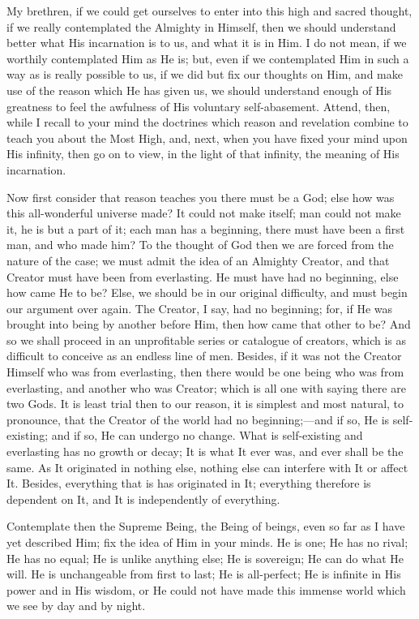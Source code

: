 My brethren, if we could get ourselves to enter into this high and
sacred thought, if we really contemplated the Almighty in Himself,
then we should understand better what His incarnation is to us, and
what it is in Him. I do not mean, if we worthily contemplated Him as
He is; but, even if we contemplated Him in such a way as is really
possible to us, if we did but fix our thoughts on Him, and make use of
the reason which He has given us, we should understand enough of His
greatness to feel the awfulness of His voluntary self-abasement.
Attend, then, while I recall to your mind the doctrines which reason
and revelation combine to teach you about the Most High, and, next,
when you have fixed your mind upon His infinity, then go on to view,
in the light of that infinity, the meaning of His incarnation.

Now first consider that reason teaches you there must be a God;
else how was this all-wonderful universe made? It could not make
itself; man could not make it, he is but a part of it; each man has a
beginning, there must have been a first man, and who made him? To the
thought of God then we are forced from the nature of the case; we must
admit the idea of an Almighty Creator, and that Creator must have been
from everlasting. He must have had no beginning, else how came He to
be? Else, we should be in our original difficulty, and must begin our
argument over again. The Creator, I say, had no beginning; for, if He
was brought into being by another before Him, then how came that other
to be? And so we shall proceed in an unprofitable series or catalogue
of creators, which is as difficult to conceive as an endless line of
men. Besides, if it was not the Creator Himself who was from
everlasting, then there would be one being who was from everlasting,
and another who was Creator; which is all one with saying there are
two Gods. It is least trial then to our reason, it is simplest and
most natural, to pronounce, that the Creator of the world had no
beginning;—and if so, He is self-existing; and if so, He can undergo
no change. What is self-existing and everlasting has no growth or
decay; It is what It ever was, and ever shall be the same. As It
originated in nothing else, nothing else can interfere with It or
affect It. Besides, everything that is has originated in It;
everything therefore is dependent on It, and It is independently of
everything.

Contemplate then the Supreme Being, the Being of beings, even so
far as I have yet described Him; fix the idea of Him in your minds. He
is one; He has no rival; He has no equal; He is unlike anything else;
He is sovereign; He can do what He will. He is unchangeable from first
to last; He is all-perfect; He is infinite in His power and in His
wisdom, or He could not have made this immense world which we see by
day and by night.

